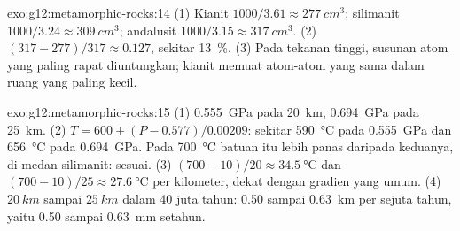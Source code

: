 \begin{solution}{exo:g12:metamorphic-rocks:14}
(1) Kianit $1000/3.61 \approx \qty{277}{cm^3}$; silimanit $1000/3.24
\approx \qty{309}{cm^3}$; andalusit $1000/3.15 \approx \qty{317}{cm^3}$.
(2) $(317 - 277)/317 \approx 0.127$, sekitar \qty{13}{\percent}. (3) Pada
tekanan tinggi, susunan atom yang paling rapat diuntungkan; kianit memuat
atom-atom yang sama dalam ruang yang paling kecil.
\end{solution}

\begin{solution}{exo:g12:metamorphic-rocks:15}
(1) \qty{0.555}{GPa} pada \qty{20}{km}, \qty{0.694}{GPa} pada \qty{25}{km}.
(2) $T = 600 + (P - 0.577)/0.00209$: sekitar \qty{590}{\celsius} pada
\qty{0.555}{GPa} dan \qty{656}{\celsius} pada \qty{0.694}{GPa}. Pada
\qty{700}{\celsius} batuan itu lebih panas daripada keduanya, di medan
silimanit: sesuai. (3) $(700 - 10)/20 \approx \qty{34.5}{\celsius}$ dan
$(700 - 10)/25 \approx \qty{27.6}{\celsius}$ per kilometer, dekat dengan
gradien yang umum. (4) $\qty{20}{km}$ sampai $\qty{25}{km}$ dalam 40 juta tahun:
0.50 sampai \qty{0.63}{km} per sejuta tahun, yaitu 0.50 sampai
\qty{0.63}{mm} setahun.
\end{solution}

